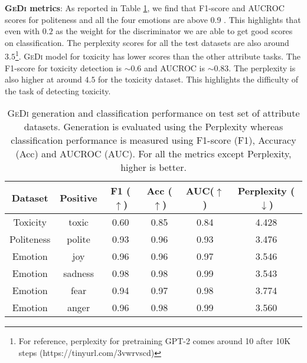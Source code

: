 \noindent\textbf{\textsc{GeDi} metrics}: As reported in Table \ref{tab:attribute-performance}, we find that F1-score and AUCROC scores for politeness and all the four emotions are above 0.9 . This highlights that even with $0.2$ as the weight for the discriminator we are able to get good scores on classification. The perplexity scores for all the test datasets are also around $3.5$\footnote{For reference, perplexity for pretraining GPT-2 comes around 10 after 10K steps (https://tinyurl.com/3vwrvscd)}. \textsc{GeDi} model for toxicity has lower scores than the other attribute tasks. The F1-score for toxicity detection is $\sim0.6$ and AUCROC is $\sim 0.83$. The perplexity is also higher at around $4.5$ for the toxicity dataset. This highlights the difficulty of the task of detecting toxicity.
\begin{table}[h!]
\scriptsize
\centering
\begin{tabular}{cc|c|c|c|c}
\hline
\textbf{Dataset} & \textbf{Positive} & \textbf{F1} ($\uparrow$) & \textbf{Acc} ($\uparrow$) & \textbf{AUC}($\uparrow$) & \textbf{Perplexity} ($\downarrow$)  \\ \hline
Toxicity & toxic  &   0.60 & 0.85  & 0.84 & 4.428\\ \hline
Politeness & polite  & 0.93 & 0.96   & 0.93 & 3.476 \\ \hline
Emotion & joy  & 0.96 & 0.96 & 0.97  & 3.546 \\ %
Emotion & sadness  & 0.98 & 0.98 & 0.99  & 3.543 \\ %
Emotion & fear  &  0.94 & 0.97  & 0.98 & 3.774\\ %
Emotion & anger  & 0.96 & 0.98  & 0.99 & 3.560 \\ \hline
\end{tabular}
\caption{\scriptsize{\textsc{GeDi} generation and classification performance on test set of attribute datasets. Generation is evaluated using the Perplexity whereas classification performance is measured using F1-score (F1), Accuracy (Acc) and AUCROC (AUC). For all the metrics except Perplexity, higher is better.}}
\label{tab:attribute-performance}
\end{table}

